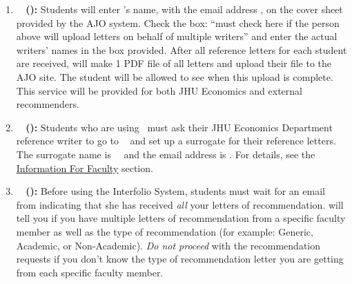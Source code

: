\documentclass{\econtex}
\begin{document}
\begin{enumerate}
\begin{itemize}
  \end{itemize}

\item \textbf{\AJO ~ (\AJOLink):}
  Students will enter {\JMStaffName}'s name, with the email address \jmstaffemail, on the cover sheet provided by the AJO system. Check the box: ``must check here if the person above will upload letters on behalf of multiple writers'' and enter the actual writers' names in the box provided. After all reference letters for each student are received, {\JMStaffName} will make 1 PDF file of all letters and upload their file to the AJO site. The student will be allowed to see when this upload is complete. This service will be provided for both JHU Economics and external recommenders.

\item \textbf{\AEA ~ (\AEALink):}
  Students who are using \AEA~must ask their JHU Economics Department reference writer to go to \AEARecLink~ and set up a surrogate for their reference letters. The surrogate name is {\JMStaffName}~{\JMStaffNameLast}~and the email address is \jmstaffemail. %
  For details, see the \href{\pageurl/RecLetters#information-for-faculty}{Information For Faculty} section.
  
  \hypertarget{students-interfolio}{}
\item \textbf{\Interfolio ~ (\InterfolioLink):}
  Before using the Interfolio System, students must wait for an email from {\JMStaffName} indicating that she has received \textit{all} your letters of recommendation. {\JMStaffName} will tell you if you have multiple letters of recommendation from a specific faculty member as well as the type of recommendation (for example: Generic, Academic, or Non-Academic). \textit{Do not proceed} with the recommendation requests if you don't know the type of recommendation letter you are getting from each specific faculty member.


\end{enumerate}
\end{document}
